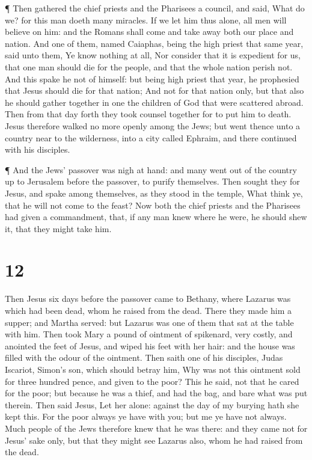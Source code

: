  ¶ Then gathered the chief priests and the Pharisees a
council, and said, What do we? for this man doeth many miracles.
 If we let him thus alone, all men will believe on him: and
the Romans shall come and take away both our place and nation.
 And one of them, named Caiaphas, being the high priest
that same year, said unto them, Ye know nothing at all, 
Nor consider that it is expedient for us, that one man should die for
the people, and that the whole nation perish not.  And this
spake he not of himself: but being high priest that year, he prophesied
that Jesus should die for that nation;  And not for that
nation only, but that also he should gather together in one the children
of God that were scattered abroad.  Then from that day
forth they took counsel together for to put him to death. 
Jesus therefore walked no more openly among the Jews; but went thence
unto a country near to the wilderness, into a city called Ephraim, and
there continued with his disciples.

 ¶ And the Jews' passover was nigh at hand: and many went
out of the country up to Jerusalem before the passover, to purify
themselves.  Then sought they for Jesus, and spake among
themselves, as they stood in the temple, What think ye, that he will not
come to the feast?  Now both the chief priests and the
Pharisees had given a commandment, that, if any man knew where he were,
he should shew it, that they might take him.

\hypertarget{section-11}{%
\section{12}\label{section-11}}

 Then Jesus six days before the passover came to Bethany,
where Lazarus was which had been dead, whom he raised from the dead.
 There they made him a supper; and Martha served: but
Lazarus was one of them that sat at the table with him. 
Then took Mary a pound of ointment of spikenard, very costly, and
anointed the feet of Jesus, and wiped his feet with her hair: and the
house was filled with the odour of the ointment.  Then saith
one of his disciples, Judas Iscariot, Simon's son, which should betray
him,  Why was not this ointment sold for three hundred
pence, and given to the poor?  This he said, not that he
cared for the poor; but because he was a thief, and had the bag, and
bare what was put therein.  Then said Jesus, Let her alone:
against the day of my burying hath she kept this.  For the
poor always ye have with you; but me ye have not always. 
Much people of the Jews therefore knew that he was there: and they came
not for Jesus' sake only, but that they might see Lazarus also, whom he
had raised from the dead.

